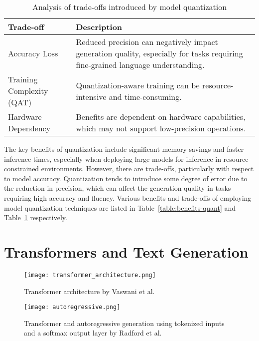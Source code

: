 \begin{table}[t]
  \centering
  \scriptsize
  \renewcommand{\arraystretch}{1.3}
  \begin{tabularx}{0.95\textwidth}{
    >{\raggedright\arraybackslash}p{5cm}
    >{\raggedright\arraybackslash}X
  }
    \toprule
    \textbf{Trade-off} & \textbf{Description} \\
    \midrule
    Accuracy Loss & Reduced precision can negatively impact generation quality, especially for tasks requiring fine-grained language understanding. \\
    Training Complexity (QAT) & Quantization-aware training can be resource-intensive and time-consuming. \\
    Hardware Dependency & Benefits are dependent on hardware capabilities, which may not support low-precision operations. \\
    \bottomrule
  \end{tabularx}
  \caption{Analysis of trade-offs introduced by model quantization}
  \label{table:trade-offs-quant}
\end{table}

The key benefits of quantization include significant memory savings and faster inference
times, especially when deploying large models for inference in resource-constrained environments.
However, there are trade-offs, particularly with respect to model accuracy.
Quantization tends to introduce some degree of error due to the reduction in precision,
which can affect the generation quality in tasks requiring high accuracy and fluency.
Various benefits and trade-offs of employing model quantization techniques
are listed in Table~\ref{table:benefits-quant} and Table~\ref{table:trade-offs-quant} respectively.

\section{Transformers and Text Generation}

\begin{figure}[t]
  \centering
  \texttt{[image: transformer\_architecture.png]}
  \caption{Transformer architecture by Vaswani et al.~\cite{vaswani2017attention}}
\end{figure}

\begin{figure}[t]
  \centering
  \texttt{[image: autoregressive.png]}
  \caption{Transformer and autoregressive generation using tokenized inputs and a softmax output layer by Radford et al.~\cite{radford2018improving}}
\end{figure}

